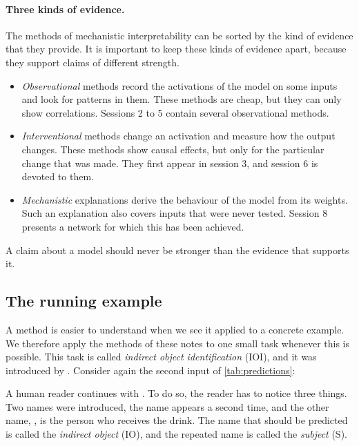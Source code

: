 \paragraph{Three kinds of evidence.} The methods of mechanistic interpretability can be sorted by the kind of
evidence that they provide. It is important to keep these kinds of evidence apart, because they support claims of
different strength.
\begin{itemize}
\item \emph{Observational} methods record the activations of the model on some inputs and look for patterns in
them. These methods are cheap, but they can only show correlations. Sessions 2 to 5 contain several observational
methods.
\item \emph{Interventional} methods change an activation and measure how the output changes. These methods show
causal effects, but only for the particular change that was made. They first appear in session 3, and session 6
is devoted to them.
\item \emph{Mechanistic} explanations derive the behaviour of the model from its weights. Such an explanation also
covers inputs that were never tested. Session 8 presents a network for which this has been achieved.
\end{itemize}
A claim about a model should never be stronger than the evidence that supports it.

\subsection{The running example}
\label{sec:running}

A method is easier to understand when we see it applied to a concrete example. We therefore apply the methods of
these notes to one small task whenever this is possible. This task is called \emph{indirect object
identification} (IOI), and it was introduced by \citet{wang2023interpretability}. Consider again the second input
of \cref{tab:predictions}:
\begin{center}
\end{center}
A human reader continues with . To do so, the reader has to notice three things. Two names were
introduced, the name  appears a second time, and the other name, , is the person who receives
the drink. The name that should be predicted is called the \emph{indirect object} (IO), and the repeated name is
called the \emph{subject} (S).

